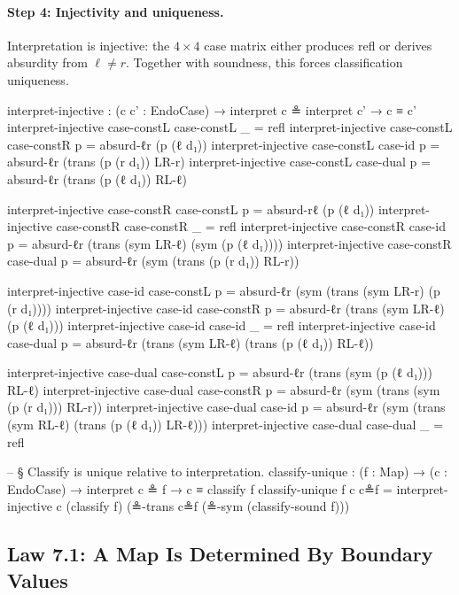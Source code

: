 \documentclass[11pt,a4paper]{book}
\def\texttt#1{#1}%
\begin{document}
\paragraph{Step 4: Injectivity and uniqueness.}
Interpretation is injective: the $4 \times 4$ case matrix either produces \texttt{refl} or derives absurdity from $\ell \neq r$.
Together with soundness, this forces classification uniqueness.

\begin{code}
  interpret-injective :
    (c c' : EndoCase) →
    interpret c ≗ interpret c' →
    c ≡ c'
  interpret-injective case-constL case-constL _ = refl
  interpret-injective case-constL case-constR p = absurd-ℓr (p (ℓ d₁))
  interpret-injective case-constL case-id     p =
    absurd-ℓr (trans (p (r d₁)) LR-r)
  interpret-injective case-constL case-dual   p =
    absurd-ℓr (trans (p (ℓ d₁)) RL-ℓ)

  interpret-injective case-constR case-constL p =
    absurd-rℓ (p (ℓ d₁))
  interpret-injective case-constR case-constR _ = refl
  interpret-injective case-constR case-id     p =
    absurd-ℓr (trans (sym LR-ℓ) (sym (p (ℓ d₁))))
  interpret-injective case-constR case-dual   p =
    absurd-ℓr (sym (trans (p (r d₁)) RL-r))

  interpret-injective case-id     case-constL p =
    absurd-ℓr (sym (trans (sym LR-r) (p (r d₁))))
  interpret-injective case-id     case-constR p =
    absurd-ℓr (trans (sym LR-ℓ) (p (ℓ d₁)))
  interpret-injective case-id     case-id     _ = refl
  interpret-injective case-id     case-dual   p =
    absurd-ℓr (trans (sym LR-ℓ) (trans (p (ℓ d₁)) RL-ℓ))

  interpret-injective case-dual   case-constL p =
    absurd-ℓr (trans (sym (p (ℓ d₁))) RL-ℓ)
  interpret-injective case-dual   case-constR p =
    absurd-ℓr (sym (trans (sym (p (r d₁))) RL-r))
  interpret-injective case-dual   case-id     p =
    absurd-ℓr (sym (trans (sym RL-ℓ) (trans (p (ℓ d₁)) LR-ℓ)))
  interpret-injective case-dual   case-dual   _ = refl

  -- § Classify is unique relative to interpretation.
  classify-unique : (f : Map) → (c : EndoCase) → interpret c ≗ f → c ≡ classify f
  classify-unique f c c≗f =
    interpret-injective c (classify f) (≗-trans c≗f (≗-sym (classify-sound f)))
\end{code}

\subsection{Law 7.1: A Map Is Determined By Boundary Values}
\end{document}

